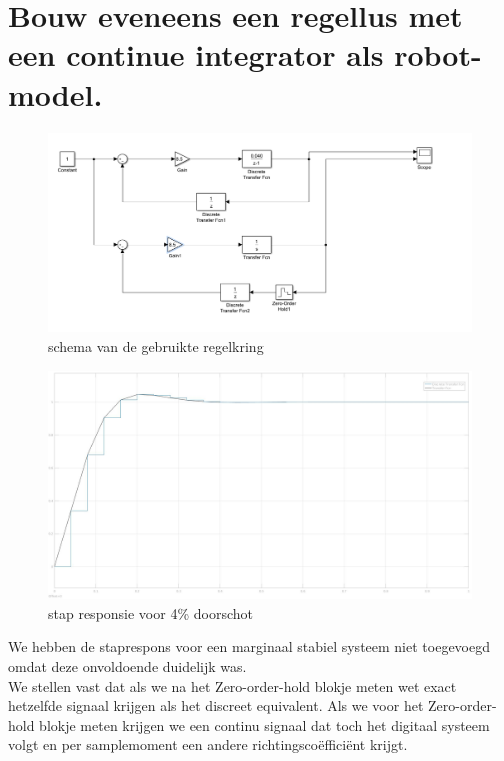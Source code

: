 \documentclass[a4paper, 12pt]{article}
\begin{document}
\section{Bouw eveneens een regellus met een continue integrator als robot-model.}

\begin{figure}[!h]
	\includegraphics[width=1\linewidth]{Labo3_5_systeem2.jpg}
	\caption{schema van de gebruikte regelkring}
\end{figure}

\begin{figure}[!h]
	\includegraphics[width=1\linewidth]{Labo3_5_stapresponse3.jpg}
	\caption{stap responsie voor 4\% doorschot}
\end{figure}

We hebben de staprespons voor een marginaal stabiel systeem niet toegevoegd omdat deze onvoldoende duidelijk was. \\

We stellen vast dat als we na het Zero-order-hold blokje meten wet exact hetzelfde signaal krijgen als het discreet equivalent. Als we voor het Zero-order-hold blokje meten krijgen we een continu signaal dat toch het digitaal systeem volgt en per samplemoment een andere richtingscoëfficiënt krijgt.
\end{document}
